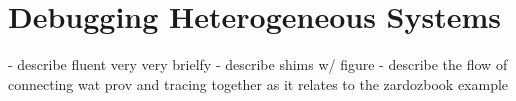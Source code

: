 \section{Debugging Heterogeneous Systems}

- describe fluent very very brielfy
- describe shims w/ figure
- describe the flow of connecting wat prov and tracing together as it relates
  to the zardozbook example
